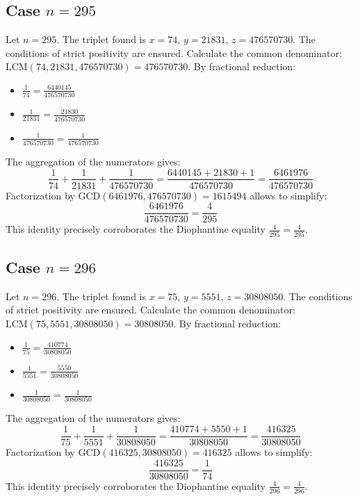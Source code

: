 \documentclass[11pt,a4paper]{article}
\begin{document}
\subsection{Case $n = 295$}
Let $n = 295$. The triplet found is $x = 74$, $y = 21831$, $z = 476570730$.
The conditions of strict positivity are ensured.
Calculate the common denominator: $\text{LCM}(74, 21831, 476570730) = 476570730$.
By fractional reduction:
\begin{itemize}
    \item $\frac{1}{74} = \frac{6440145}{476570730}$
    \item $\frac{1}{21831} = \frac{21830}{476570730}$
    \item $\frac{1}{476570730} = \frac{1}{476570730}$
\end{itemize}
The aggregation of the numerators gives:
$$ \frac{1}{74} + \frac{1}{21831} + \frac{1}{476570730} = \frac{6440145 + 21830 + 1}{476570730} = \frac{6461976}{476570730} $$
Factorization by $\text{GCD}(6461976, 476570730) = 1615494$ allows to simplify:
$$ \frac{6461976}{476570730} = \frac{4}{295} $$
This identity precisely corroborates the Diophantine equality $\frac{4}{295} = \frac{4}{295}$.

\subsection{Case $n = 296$}
Let $n = 296$. The triplet found is $x = 75$, $y = 5551$, $z = 30808050$.
The conditions of strict positivity are ensured.
Calculate the common denominator: $\text{LCM}(75, 5551, 30808050) = 30808050$.
By fractional reduction:
\begin{itemize}
    \item $\frac{1}{75} = \frac{410774}{30808050}$
    \item $\frac{1}{5551} = \frac{5550}{30808050}$
    \item $\frac{1}{30808050} = \frac{1}{30808050}$
\end{itemize}
The aggregation of the numerators gives:
$$ \frac{1}{75} + \frac{1}{5551} + \frac{1}{30808050} = \frac{410774 + 5550 + 1}{30808050} = \frac{416325}{30808050} $$
Factorization by $\text{GCD}(416325, 30808050) = 416325$ allows to simplify:
$$ \frac{416325}{30808050} = \frac{1}{74} $$
This identity precisely corroborates the Diophantine equality $\frac{4}{296} = \frac{4}{296}$.
\end{document}
